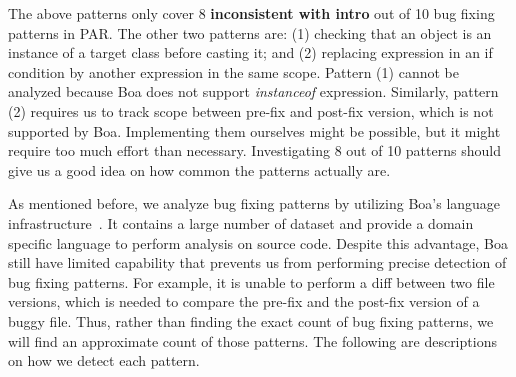\documentclass{sig-alternate-05-2015}
\newcommand{\todo}[1]
  {{\scriptsize \textbf{\color{red} {#1}}}}
\begin{document}
The above patterns only cover 8 \todo{inconsistent with intro} out of 10 bug fixing patterns in PAR. The other two patterns are: (1) checking that an object is an instance of a target class before casting it; and (2) replacing expression in an if condition by another expression in the same scope. Pattern (1) cannot be analyzed because Boa does not support {\em instanceof} expression. Similarly, pattern (2) requires us to track scope between pre-fix and post-fix version, which is not supported by Boa. Implementing them ourselves might be possible, but it might require too much effort than necessary. Investigating 8 out of 10 patterns should give us a good idea on how common the patterns actually are.

As mentioned before, we analyze bug fixing patterns by utilizing Boa's language
infrastructure~\cite{dyer2013}. It contains a large number of dataset and provide
a domain specific language to perform analysis on source code. Despite this
advantage, Boa still have limited capability that prevents us from performing
precise detection of bug fixing patterns. For example, it is unable to perform a
diff between two file versions, which is needed to compare the pre-fix and the
post-fix version of a buggy file. Thus, rather than finding the exact count of
bug fixing patterns, we will find an approximate count of those patterns. The
following are descriptions on how we detect each pattern.
\end{document}
